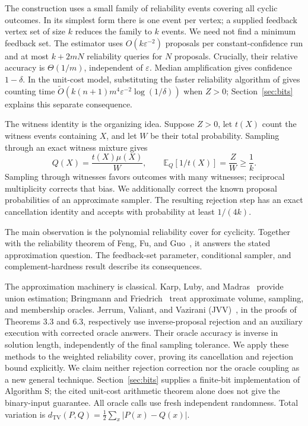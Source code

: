 \documentclass[11pt]{article}
\newcommand{\TV}{d_{\mathrm{TV}}}
\newcommand{\E}{\mathbb{E}}
\begin{document}
The construction uses a small family of reliability events covering all
cyclic outcomes. In its simplest form there is one event per vertex;
a supplied feedback vertex set of size $k$ reduces the family to $k$ events.
We need not find a minimum feedback set. The estimator uses
$O(k\varepsilon^{-2})$ proposals per constant-confidence run and at most
$k+2mN$ reliability queries for $N$ proposals. Crucially, their relative
accuracy is $\Theta(1/m)$, independent of $\varepsilon$.
Median amplification gives confidence $1-\delta$.
In the unit-cost model, substituting the faster reliability algorithm of
\cite[Theorem 1]{ffg} gives counting time
$\widetilde O(k(n+1)m^4\varepsilon^{-2}\log(1/\delta))$ when $Z>0$;
Section~\ref{sec:bits} explains this separate consequence.

The witness identity is the organizing idea. Suppose $Z>0$, let $t(X)$
count the witness events containing $X$, and let $W$ be their total
probability. Sampling through an exact witness mixture gives
\[
 Q(X)=\frac{t(X)\mu(X)}{W},\qquad
 \E_Q[1/t(X)]=\frac ZW\geq\frac1k.
\]
Sampling through witnesses favors outcomes with many witnesses; reciprocal
multiplicity corrects that bias. We additionally correct the known proposal
probabilities of an approximate sampler. The resulting rejection step has
an exact cancellation identity and accepts with probability at least $1/(4k)$.

The main observation is the polynomial reliability cover for cyclicity.
Together with the reliability theorem of Feng, Fu, and Guo~\cite{ffg}, it
answers the stated approximation question. The feedback-set parameter,
conditional sampler, and complement-hardness result describe its consequences.

The approximation machinery is classical. Karp, Luby, and Madras~\cite{klm}
provide union estimation; Bringmann and Friedrich~\cite{bf} treat approximate
volume, sampling, and membership oracles. Jerrum, Valiant, and Vazirani
(JVV)~\cite{jvv}, in the proofs of Theorems 3.3 and 6.3, respectively use
inverse-proposal rejection and an auxiliary execution with corrected oracle
answers. Their oracle accuracy is inverse in solution length, independently
of the final sampling tolerance. We apply these methods to the weighted
reliability cover, proving its cancellation and rejection bound explicitly.
We claim neither rejection correction nor the oracle coupling as a new
general technique. Section~\ref{sec:bits} supplies a finite-bit implementation
of Algorithm S; the cited unit-cost arithmetic theorem alone does not give
the binary-input guarantee.
All oracle calls use fresh independent randomness. Total variation is
$\TV(P,Q)=\frac12\sum_x|P(x)-Q(x)|$.
\end{document}
